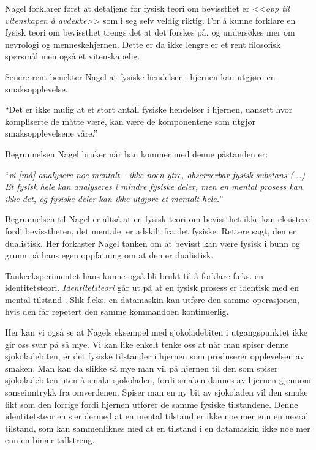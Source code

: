 Nagel forklarer først at detaljene for fysisk teori om bevissthet er <<\emph{opp til vitenskapen å avdekke}>> som i seg selv veldig riktig.
For å kunne forklare en fysisk teori om bevissthet trengs det at det forskes på,
og undersøkes mer om nevrologi og menneskehjernen. Dette er da ikke lengre er et rent filosofisk spørsmål men også et vitenskapelig.

Senere rent benekter Nagel at fysiske hendelser i hjernen kan utgjøre en smaksopplevelse.
\begin{pquotation}{\cite[36]{Nagel2003}}
    ``Det er ikke mulig at et stort antall fysiske hendelser i hjernen,
uansett hvor kompliserte de måtte være, 
kan være de komponentene som utgjør smaksopplevelsene våre.''
\end{pquotation}
Begrunnelsen Nagel bruker når han kommer med denne påstanden er:
\begin{pquotation}{\cite[36]{Nagel2003}}
``\textit{vi [må] analysere noe mentalt - ikke noen ytre, observerbar fysisk substans (...) 
Et fysisk hele kan analyseres i mindre fysiske deler, men en
mental prosess kan ikke det, og fysiske deler kan ikke utgjøre et mentalt hele.}''
\end{pquotation}
Begrunnelsen til Nagel er altså at en fysisk teori om bevissthet ikke kan eksistere fordi bevisstheten, 
det mentale, er adskilt fra det fysiske. Rettere sagt, den er dualistisk. 
Her forkaster Nagel tanken om at bevisst kan være fysisk i bunn og grunn på hans egen oppfatning om at den er dualistisk.

Tankeeksperimentet hans kunne også bli brukt til å forklare f.eks. en identitetsteori.
\textit{Identitetsteori} går ut på at en fysisk prosess er identisk med en mental tilstand \autocite{snl:identitetsteori}.
Slik f.eks. en datamaskin kan utføre den samme operasjonen,
hvis den får repetert den samme kommandoen kontinuerlig.

Her kan vi også se at Nagels eksempel med sjokoladebiten i utgangspunktet 
ikke gir oss svar på så mye.
Vi kan like enkelt tenke oss at når man spiser denne sjokoladebiten,
er det fysiske tilstander i hjernen som produserer opplevelsen av smaken. 
Man kan da slikke så mye man vil på hjernen til den som spiser sjokoladebiten 
uten å smake sjokoladen, fordi smaken dannes av hjernen gjennom sanseinntrykk fra omverdenen.
Spiser man en ny bit av sjokoladen vil den smake likt som den forrige fordi hjernen 
utfører de samme fysiske tilstandene.
Denne identitetsteorien sier dermed at en mental tilstand er ikke noe mer enn en nevral tilstand,
som kan sammenliknes med at en tilstand i en datamaskin ikke noe mer enn en binær tallstreng.

